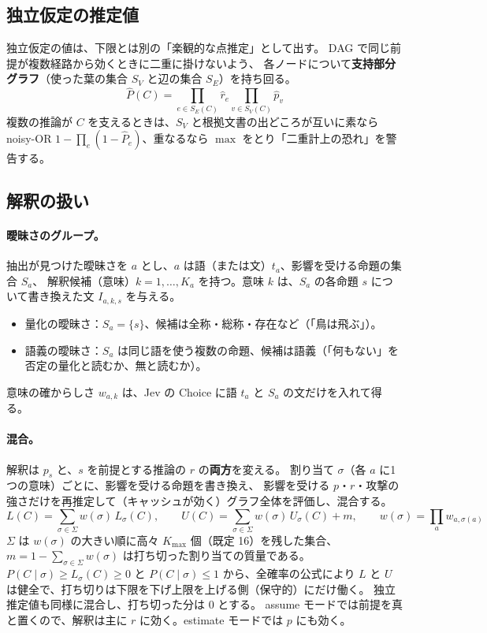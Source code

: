 \documentclass[a4paper,11pt]{ltjsarticle}
\begin{document}
\subsection{独立仮定の推定値}\label{sec:indep}

独立仮定の値は、下限とは別の「楽観的な点推定」として出す。
DAG で同じ前提が複数経路から効くときに二重に掛けないよう、
各ノードについて\textbf{支持部分グラフ}（使った葉の集合 $S_V$ と辺の集合 $S_E$）を持ち回る。
\begin{equation}
  \hat P(C) = \prod_{e\in S_E(C)} \hat r_e \prod_{v\in S_V(C)} \hat p_v
\end{equation}
複数の推論が $C$ を支えるときは、$S_V$ と根拠文書の出どころが互いに素なら noisy-OR
$1-\prod_e(1-\hat P_e)$、重なるなら $\max$ をとり「二重計上の恐れ」を警告する。

\subsection{解釈の扱い}\label{sec:reading}

\paragraph{曖昧さのグループ。}
抽出が見つけた曖昧さを $a$ とし、$a$ は語（または文）$t_a$、影響を受ける命題の集合 $S_a$、
解釈候補（意味）$k=1,\dots,K_a$ を持つ。意味 $k$ は、$S_a$ の各命題 $s$ について書き換えた文 $I_{a,k,s}$ を与える。
\begin{itemize}
  \item 量化の曖昧さ：$S_a=\{s\}$、候補は全称・総称・存在など（「鳥は飛ぶ」）。
  \item 語義の曖昧さ：$S_a$ は同じ語を使う複数の命題、候補は語義（「何もない」を否定の量化と読むか、無と読むか）。
\end{itemize}
意味の確からしさ $w_{a,k}$ は、Jev の Choice に語 $t_a$ と $S_a$ の文だけを入れて得る。

\paragraph{混合。}
解釈は $p_s$ と、$s$ を前提とする推論の $r$ の\textbf{両方}を変える。
割り当て $\sigma$（各 $a$ に1つの意味）ごとに、影響を受ける命題を書き換え、
影響を受ける $p$・$r$・攻撃の強さだけを再推定して（キャッシュが効く）グラフ全体を評価し、混合する。
\begin{equation}
  L(C) = \sum_{\sigma\in\Sigma} w(\sigma)\, L_\sigma(C),\qquad
  U(C) = \sum_{\sigma\in\Sigma} w(\sigma)\, U_\sigma(C) + m,\qquad
  w(\sigma)=\prod_a w_{a,\sigma(a)}
\end{equation}
$\Sigma$ は $w(\sigma)$ の大きい順に高々 $K_{\max}$ 個（既定 16）を残した集合、
$m = 1-\sum_{\sigma\in\Sigma}w(\sigma)$ は打ち切った割り当ての質量である。
$P(C\mid\sigma)\ge L_\sigma(C)\ge 0$ と $P(C\mid\sigma)\le 1$ から、全確率の公式により
$L$ と $U$ は健全で、打ち切りは下限を下げ上限を上げる側（保守的）にだけ働く。
独立推定値も同様に混合し、打ち切った分は 0 とする。
assume モードでは前提を真と置くので、解釈は主に $r$ に効く。estimate モードでは $p$ にも効く。
\end{document}
